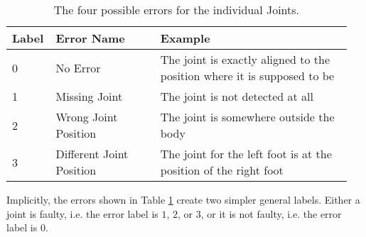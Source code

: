 \begin{table}[htb]
  \centering
  \caption{The four possible errors for the individual Joints.}
  \label{tab:jt_errs}
  \begin{tabular}{p{0.1\linewidth}p{0.3\linewidth}p{0.55\linewidth}}
  \hline
  \textbf{Label} & \textbf{Error Name}      & \textbf{Example} \\ \hline
  0                    & No Error                 & The joint is exactly aligned to the position where it is supposed to be \\
  1                    & Missing Joint            & The joint is not detected at all \\
  2                    & Wrong Joint Position     & The joint is somewhere outside the body \\
  3                    & Different Joint Position & The joint for the left foot is at the position of the right foot \\
  \hline   
  \end{tabular}
\end{table}

Implicitly, the errors shown in Table \ref{tab:jt_errs} create two simpler general labels. Either a joint is faulty, i.e. the error label is $1$, $2$, or $3$, or it is not faulty, i.e. the error label is $0$.

